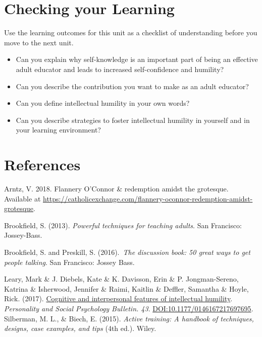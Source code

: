 \documentclass[
]{book}
\providecommand{\tightlist}{%
  \setlength{\itemsep}{0pt}\setlength{\parskip}{0pt}}
\begin{document}
\hypertarget{checking-your-learning-8}{%
\section*{Checking your Learning}\label{checking-your-learning-8}}

\begin{progress}
Use the learning outcomes for this unit as a checklist of understanding
before you move to the next unit.

\begin{itemize}
\tightlist
\item
  Can you explain why self-knowledge is an important part of being an
  effective adult educator and leads to increased self-confidence and
  humility?
\item
  Can you describe the contribution you want to make as an adult
  educator?
\item
  Can you define intellectual humility in your own words?
\item
  Can you describe strategies to foster intellectual humility in
  yourself and in your learning environment?
\end{itemize}
\end{progress}

\hypertarget{references-4}{%
\section*{References}\label{references-4}}

Arntz, V. 2018. Flannery O'Connor \& redemption amidst the grotesque. Available at \url{https://catholicexchange.com/flannery-oconnor-redemption-amidst-grotesque}.

Brookfield, S. (2013). \emph{Powerful techniques for teaching adults}. San Francisco: Jossey-Bass.

Brookfield, S. and Preskill, S. (2016).~\emph{The discussion book: 50 great ways to get people talking}. San Francisco: Jossey Bass. ~

Leary, Mark \& J. Diebels, Kate \& K. Davisson, Erin \& P. Jongman-Sereno, Katrina \& Isherwood, Jennifer \& Raimi, Kaitlin \& Deffler, Samantha \& Hoyle, Rick. (2017). \href{https://journals-sagepub-com.ezproxy.student.twu.ca/doi/pdf/10.1177/0146167217697695?}{Cognitive and interpersonal features of intellectual humility}. \emph{Personality and Social Psychology Bulletin. 43}. \url{DOI:10.1177/0146167217697695}.
Silberman, M. L., \& Biech, E. (2015). \emph{Active training: A handbook of techniques, designs, case examples, and tips} (4th ed.). Wiley.
\end{document}
